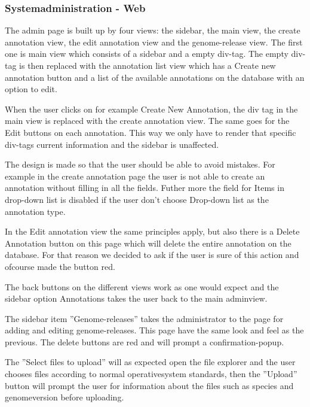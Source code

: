 \subsubsection{Systemadministration - Web}
The admin page is built up by four views: the sidebar, the main view, the create annotation view, the edit annotation view and the genome-release view. The first one is main view which consists of a sidebar and a empty div-tag. 
The empty div-tag is then replaced with the annotation list view which has a Create new annotation button 
and a list of the available annotations on the database with an option to edit. 

When the user clicks on for example Create New Annotation, the div tag in the main view is replaced with the create annotation view.
The same goes for the Edit buttons on each annotation. This way we only have to render that specific div-tags current information 
and the sidebar is unaffected. 

The design is made so that the user should be able to avoid mistakes. For example in the 
create annotation page the user is not able to create an annotation without filling in all the fields. Futher more the 
field for Items in drop-down list is disabled if the user don't choose Drop-down list as the annotation type. 

In the Edit annotation view the same principles apply, but also there is a Delete Annotation button on this page which will
delete the entire annotation on the database.
For that reason we decided to ask if the user is sure of this action and ofcourse made the button red.

The back buttons on the different views work as one would expect and the sidebar option Annotations takes the user back to the main adminview.

The sidebar item ''Genome-releases'' takes the administrator to the page for adding and editing genome-releases. This page have the same look and feel as the previous. The delete buttons are red and will prompt a confirmation-popup. 

The ''Select files to upload'' will as expected open the file explorer and the user chooses files according to normal operativesystem standards, then the ''Upload'' button will prompt the user for information about the files such as species and genomeversion before uploading. 
